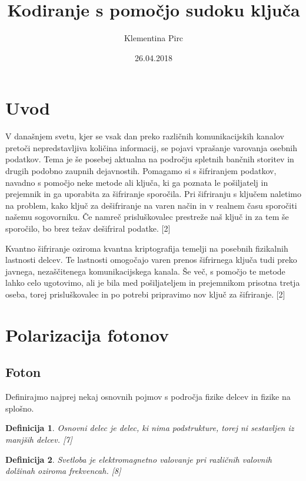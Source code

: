 \documentclass[A4paper, 11pt]{article}
\title{Kodiranje s pomočjo sudoku ključa}
\author{Klementina Pirc}
\date{26.04.2018}
\newtheorem{definicija}{Definicija}
\begin{document}
\maketitle



\section{Uvod}

V današnjem svetu, kjer se vsak dan preko različnih komunikacijskih kanalov pretoči nepredstavljiva količina informacij, se pojavi vprašanje varovanja osebnih podatkov. Tema je še posebej aktualna na področju spletnih bančnih storitev in drugih podobno zaupnih dejavnostih. Pomagamo si s šifriranjem podatkov, navadno s pomočjo neke metode ali ključa, ki ga poznata le pošiljatelj in prejemnik in ga uporabita za šifriranje sporočila. Pri šifriranju s ključem naletimo na problem, kako ključ za dešifriranje na varen način in v realnem času sporočiti našemu sogovorniku. Če namreč prisluškovalec prestreže naš ključ in za tem še sporočilo, bo brez težav dešifriral podatke. [2]

Kvantno šifriranje oziroma kvantna kriptografija temelji na posebnih fizikalnih lastnosti delcev. Te lastnosti omogočajo varen prenos šifrirnega ključa tudi preko javnega, nezaščitenega komunikacijskega kanala. Še več, s pomočjo te metode lahko celo ugotovimo, ali je bila med pošiljateljem in prejemnikom prisotna tretja oseba, torej prisluškovalec in po potrebi pripravimo nov ključ za šifriranje. [2]



\section{Polarizacija fotonov}

\subsection{Foton}

Definirajmo najprej nekaj osnovnih pojmov s področja fizike delcev in fizike na splošno.

\begin{definicija}
Osnovni delec je delec, ki nima podstrukture, torej ni sestavljen iz manjših delcev. [7]
\end{definicija}

\begin{definicija}
Svetloba je elektromagnetno valovanje pri različnih valovnih dolžinah oziroma frekvencah. [8]
\end{definicija}
\end{document}
